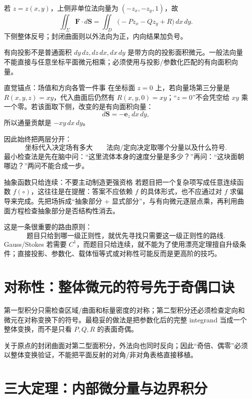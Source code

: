 \documentclass[11pt,a4paper,fontset=fandol]{ctexart}
\begin{document}
若 $z=z(x,y)$，上侧非单位法向量为 $(-z_x,-z_y,1)$，故
\[
\boxed{
\iint_\Sigma\mathbf F\cdot d\mathbf S
=\iint_D\bigl(-Pz_x-Qz_y+R\bigr)\,dx\,dy.}
\]
下侧整体反号；封闭曲面则以外法向为正，内向结果加负号。

\begin{warnbox}{有向投影不是普通面积}
$dy\,dz,dz\,dx,dx\,dy$ 是带方向的投影面积微元。一般法向量不能直接与任意坐标平面微元相乘；必须使用与投影/参数化匹配的有向面积向量。
\end{warnbox}

\begin{corebox}{直觉锚点：场值和方向各管一件事}
在坐标面 $z=0$ 上，若向量场第三分量是 $R(x,y,z)=xy$，代入曲面后仍然有 $R(x,y,0)=xy$；“$z=0$”不会凭空给 $xy$ 乘一个零。若该面取下侧，改变的是有向面积向量：
\[
d\mathbf S=-\mathbf e_z\,dx\,dy,
\]
所以通量贡献是 $-xy\,dx\,dy$。

因此始终把两层分开：
\[
\boxed{\text{坐标代入决定场有多大}\qquad\text{法向/定向决定取哪个分量以及什么符号}.}
\]
最小检查法是先在脑中问：“这里流体本身的速度分量是多少？”再问：“这块面朝哪边？”两问不能合成一步。
\end{corebox}

\begin{corebox}{抽象函数只给连续：不要主动制造更强资格}
若题目把一个复杂项写成任意连续函数 $f(\circ)$，这往往是在提醒：答案不应依赖 $f$ 的具体形式，也不应通过对 $f$ 求偏导来完成。先把场拆成“抽象部分 + 显式部分”，与有向微元逐层点乘，再利用曲面方程检查抽象部分是否结构性消去。

这是一条很重要的路由原则：
\[
\boxed{\text{题目只给到哪一级正则性，就优先寻找只需要这一级正则性的路线}.}
\]
Gauss/Stokes 若需要 $C^1$，而题目只给连续，就不能为了使用漂亮定理擅自升级条件；直接投影、参数化、载体恒等式或对称性可能反而是更高阶的技巧。
\end{corebox}

\section{对称性：整体微元的符号先于奇偶口诀}

第一型积分只需检查区域/曲面和标量密度的对称；第二型积分还必须检查定向和微元在对称变换下的符号。最稳妥的做法是把参数化后的完整 integrand 当成一个整体变换，而不是只看 $P,Q,R$ 的表面奇偶。

关于原点的封闭曲面对第二型面积分，外法向也同时反向；因此“奇倍、偶零”必须以整体变换验证，不能把平面反射的对角/非对角表格直接移植。

\section{三大定理：内部微分量与边界积分}
\end{document}
